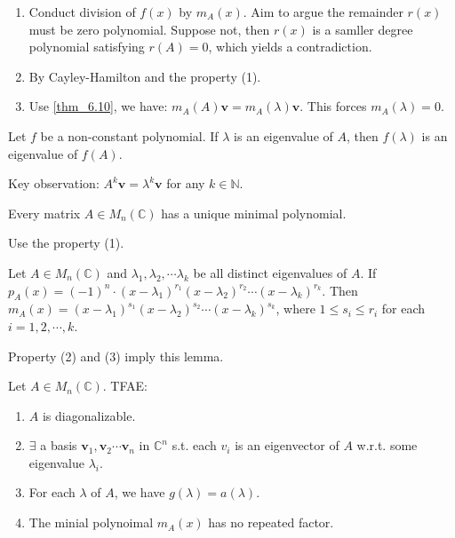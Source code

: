 \documentclass[12pt]{article}
\begin{document}
\begin{pf}
    \begin{enumerate}
        \item Conduct division of $f(x)$ by $m_A(x)$. Aim to argue the remainder $r(x)$ must be zero polynomial. Suppose not, then $r(x)$ is a samller degree polynomial satisfying $r(A)=0$, which yields a contradiction.
        \item By Cayley-Hamilton and the property (1).
        \item Use \eqref{thm_6.10}, we have: $m_A(A)\mathbf{v}=m_A(\lambda)\mathbf{v}$. This forces $m_A(\lambda)=0.$
    \end{enumerate}
\end{pf}

\begin{theorem}
    Let $f$ be a non-constant polynomial. If $\lambda$ is an eigenvalue of $A$,
    then $f(\lambda)$ is an eigenvalue of $f(A)$.
    \label{thm_6.10}
\end{theorem}

\begin{pf}
    Key observation: $A^k\mathbf{v} =\lambda^k\mathbf{v}$ for any $k\in\mathbb{N}$.
\end{pf}

\begin{lemma}
    Every matrix $A\in M_n(\mathbb{C})$ has a unique minimal polynomial.
\end{lemma}
\begin{pf}
    Use the property (1).
\end{pf}

\begin{lemma}
     Let $A\in M_n(\mathbb{C})$ and $\lambda_1, \lambda_2, \cdots\lambda_k$ be all distinct eigenvalues of $A$.
     If $p_A(x)=(-1)^n\cdot(x-\lambda_1)^{r_1}(x-\lambda_2)^{r_2}\cdots(x-\lambda_k)^{r_k}$.
     Then $m_A(x)=(x-\lambda_1)^{s_1}(x-\lambda_2)^{s_2}\cdots(x-\lambda_k)^{s_k}$,
     where $1\le s_i \le r_i$ for each $i=1,2,\cdots,k$.
\end{lemma}

\begin{pf}
    Property (2) and (3) imply this lemma.
\end{pf}





\begin{theorem}
Let $A\in M_n(\mathbb{C})$. TFAE:
\begin{enumerate}
    \item $A$ is diagonalizable.
    \item $\exists$ a basis ${\mathbf{v}_1,\mathbf{v}_2\cdots\mathbf{v}_n}$ in $\mathbb{C}^n$ s.t. each $v_i$ is an eigenvector of $A$ w.r.t. some eigenvalue $\lambda_i$.
    \item For each $\lambda$ of $A$, we have $g(\lambda)=a(\lambda)$.
    \item The minial polynoimal $m_A(x)$ has no repeated factor.
\end{enumerate}
\end{theorem}
\end{document}
